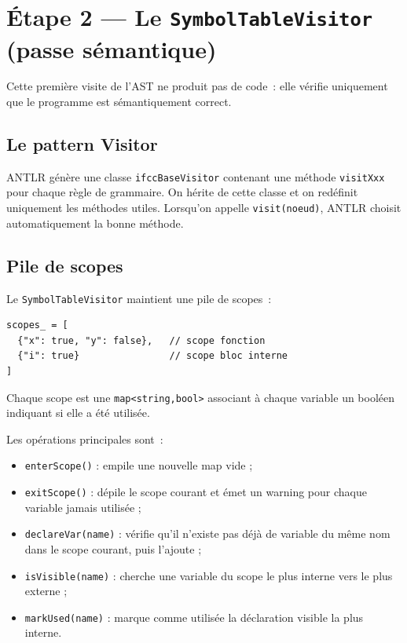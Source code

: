 \documentclass[11pt,a4paper]{article}
\begin{document}
\section{Étape 2 --- Le \texttt{SymbolTableVisitor} (passe sémantique)}

Cette première visite de l'AST ne produit pas de code~: elle vérifie uniquement que le programme est sémantiquement correct.

\subsection{Le pattern Visitor}

ANTLR génère une classe \texttt{ifccBaseVisitor} contenant une méthode \texttt{visitXxx} pour chaque règle de grammaire. On hérite de cette classe et on redéfinit uniquement les méthodes utiles. Lorsqu'on appelle \texttt{visit(noeud)}, ANTLR choisit automatiquement la bonne méthode.

\subsection{Pile de scopes}

Le \texttt{SymbolTableVisitor} maintient une pile de scopes~:

\begin{lstlisting}
scopes_ = [
  {"x": true, "y": false},   // scope fonction
  {"i": true}                // scope bloc interne
]
\end{lstlisting}

Chaque scope est une \texttt{map<string,bool>} associant à chaque variable un booléen indiquant si elle a été utilisée.

Les opérations principales sont~:

\begin{itemize}
  \item \texttt{enterScope()} : empile une nouvelle map vide ;
  \item \texttt{exitScope()} : dépile le scope courant et émet un warning pour chaque variable jamais utilisée ;
  \item \texttt{declareVar(name)} : vérifie qu'il n'existe pas déjà de variable du même nom dans le scope courant, puis l'ajoute ;
  \item \texttt{isVisible(name)} : cherche une variable du scope le plus interne vers le plus externe ;
  \item \texttt{markUsed(name)} : marque comme utilisée la déclaration visible la plus interne.
\end{itemize}
\end{document}
